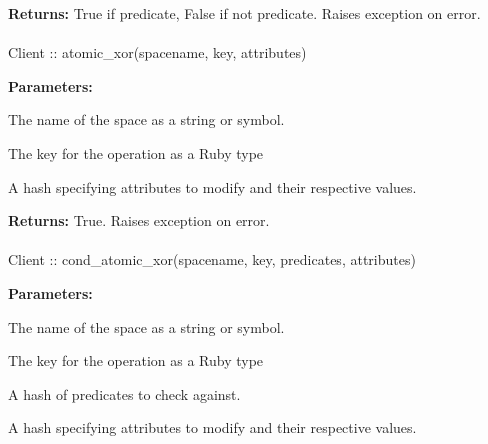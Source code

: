 \noindent\textbf{Returns:}
True if predicate, False if not predicate.  Raises exception on error.

\paragraph{}
\label{api:ruby:atomic_xor}
\begin{ccode}
Client :: atomic_xor(spacename, key, attributes)
\end{ccode}
\funcdesc 

\noindent\textbf{Parameters:}
\begin{description}[labelindent=\widthof{{\code{attributes}}},leftmargin=*,noitemsep,nolistsep,align=right]
\item[\code{spacename}] The name of the space as a string or symbol.
\item[\code{key}] The key for the operation as a Ruby type
\item[\code{attributes}] A hash specifying attributes to modify and their respective values.
\end{description}

\noindent\textbf{Returns:}
True.  Raises exception on error.

\paragraph{}
\label{api:ruby:cond_atomic_xor}
\begin{ccode}
Client :: cond_atomic_xor(spacename, key, predicates, attributes)
\end{ccode}
\funcdesc 

\noindent\textbf{Parameters:}
\begin{description}[labelindent=\widthof{{\code{predicates}}},leftmargin=*,noitemsep,nolistsep,align=right]
\item[\code{spacename}] The name of the space as a string or symbol.
\item[\code{key}] The key for the operation as a Ruby type
\item[\code{predicates}] A hash of predicates to check against.
\item[\code{attributes}] A hash specifying attributes to modify and their respective values.
\end{description}

